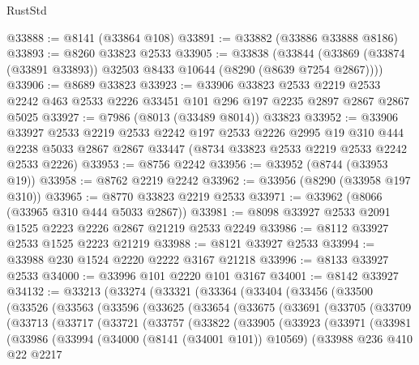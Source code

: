 \begin{lexlean}{RustStd}
\begin{coremodule}
@33888 := @8141 (@33864 @108)
@33891 := @33882 (@33886 @33888 @8186)
@33893 := @8260 @33823 @2533
@33905 := @33838
    (@33844 (@33869 (@33874 (@33891 @33893)) @32503 @8433 @10644 (@8290 (@8639 @7254 @2867))))
@33906 := @8689 @33823
@33923 := @33906
    @33823
    @2533
    @2219
    @2533
    @2242
    @463
    @2533
    @2226
    @33451
    @101
    @296
    @197
    @2235
    @2897
    @2867
    @2867
    @5025
@33927 := @7986 (@8013 (@33489 @8014)) @33823
@33952 := @33906
    @33927
    @2533
    @2219
    @2533
    @2242
    @197
    @2533
    @2226
    @2995
    @19
    @310
    @444
    @2238
    @5033
    @2867
    @2867
    @33447
    (@8734 @33823 @2533 @2219 @2533 @2242 @2533 @2226)
@33953 := @8756 @2242
@33956 := @33952 (@8744 (@33953 @19))
@33958 := @8762 @2219 @2242
@33962 := @33956 (@8290 (@33958 @197 @310))
@33965 := @8770 @33823 @2219 @2533
@33971 := @33962 (@8066 (@33965 @310 @444 @5033 @2867))
@33981 := @8098 @33927 @2533 @2091 @1525 @2223 @2226 @2867 @21219 @2533 @2249
@33986 := @8112 @33927 @2533 @1525 @2223 @21219
@33988 := @8121 @33927 @2533
@33994 := @33988 @230 @1524 @2220 @2222 @3167 @21218
@33996 := @8133 @33927 @2533
@34000 := @33996 @101 @2220 @101 @3167
@34001 := @8142 @33927
@34132 := @33213
    (@33274
      (@33321
        (@33364
          (@33404
            (@33456
              (@33500
                (@33526
                  (@33563
                    (@33596
                      (@33625
                        (@33654
                          (@33675
                            (@33691
                              (@33705
                                (@33709
                                  (@33713
                                    (@33717
                                      (@33721
                                        (@33757
                                          (@33822
                                            (@33905
                                              (@33923
                                                (@33971
                                                  (@33981
                                                    (@33986
                                                      (@33994
                                                        (@34000 (@8141 (@34001 @101)) @10569)
                                                        (@33988
                                                          @236
                                                          @410
                                                          @22
                                                          @2217

\end{coremodule}
\end{lexlean}
